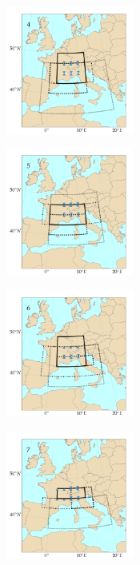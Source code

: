 \documentclass[5p]{elsarticle}
\begin{document}
\begin{figure}[htb]
\begin{subfigure}{.5\columnwidth}
	\end{subfigure}%
	\begin{subfigure}{.5\columnwidth}
		\centering
		\includegraphics[width=4.2cm]{figures/spatial_win_z4-hi2/Spatial_windows_4.png}
	\end{subfigure}
	\begin{subfigure}{.5\columnwidth}
		\centering
		\includegraphics[width=4.2cm]{figures/spatial_win_z4-hi2/Spatial_windows_5.png}
	\end{subfigure}%
	\begin{subfigure}{.5\columnwidth}
		\centering
		\includegraphics[width=4.2cm]{figures/spatial_win_z4-hi2/Spatial_windows_6.png}
	\end{subfigure}
	\begin{subfigure}{.5\columnwidth}
		\centering
		\includegraphics[width=4.2cm]{figures/spatial_win_z4-hi2/Spatial_windows_7.png}

\end{subfigure}
\end{figure}
\end{document}
